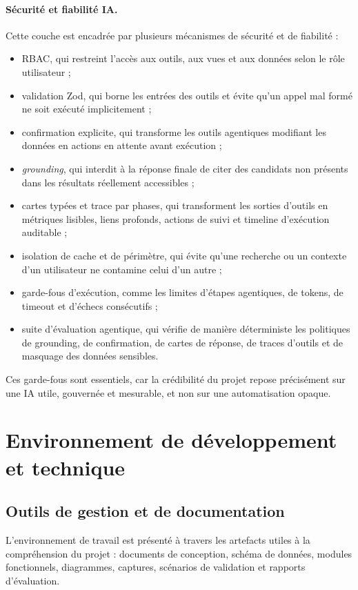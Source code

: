 \paragraph{Sécurité et fiabilité IA.}
Cette couche est encadrée par plusieurs mécanismes de sécurité et de fiabilité :
\begin{itemize}
  \item RBAC, qui restreint l'accès aux outils, aux vues et aux données selon le rôle utilisateur ;
  \item validation Zod, qui borne les entrées des outils et évite qu'un appel mal formé ne soit exécuté implicitement ;
  \item confirmation explicite, qui transforme les outils agentiques modifiant les données en actions en attente avant exécution ;
  \item \textit{grounding}, qui interdit à la réponse finale de citer des candidats non présents dans les résultats réellement accessibles ;
  \item cartes typées et trace par phases, qui transforment les sorties d'outils en métriques lisibles, liens profonds, actions de suivi et timeline d'exécution auditable ;
  \item isolation de cache et de périmètre, qui évite qu'une recherche ou un contexte d'un utilisateur ne contamine celui d'un autre ;
  \item garde-fous d'exécution, comme les limites d'étapes agentiques, de tokens, de timeout et d'échecs consécutifs ;
  \item suite d'évaluation agentique, qui vérifie de manière déterministe les politiques de grounding, de confirmation, de cartes de réponse, de traces d'outils et de masquage des données sensibles.
\end{itemize}

Ces garde-fous sont essentiels, car la crédibilité du projet repose précisément sur une IA utile, gouvernée et mesurable, et non sur une automatisation opaque.

\section{Environnement de développement et technique}

\subsection{Outils de gestion et de documentation}
L'environnement de travail est présenté à travers les artefacts utiles à la compréhension du projet : documents de conception, schéma de données, modules fonctionnels, diagrammes, captures, scénarios de validation et rapports d'évaluation.

